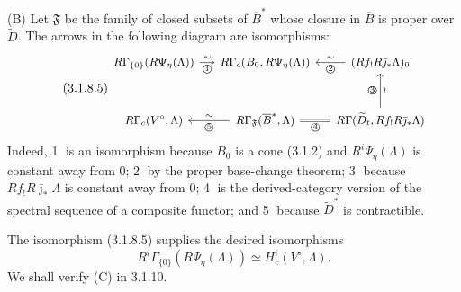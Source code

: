 \medskip
\noindent\textup{(B)}
Let $\mathfrak F$ be the family of closed subsets of $\overline B^*$
whose closure in $\overline B$ is proper over $\widetilde D$.  The
arrows in the following diagram are isomorphisms:
\begin{equation}\tag{3.1.8.5}
\begin{tikzcd}[column sep=small,row sep=large,cells={nodes={font=\small}}]
R\Gamma_{\{0\}}(R\Psi_\eta(\Lambda))
  \arrow[r,"\sim","\text{\textcircled{1}}"']
  & R\Gamma_c(B_0,R\Psi_\eta(\Lambda))
  & (Rf_!R\bar\jmath_*\Lambda)_0
      \arrow[l,"\sim"',"\text{\textcircled{2}}"] \\
R\Gamma_c(V^\circ,\Lambda)
  & R\Gamma_{\mathfrak F}(\overline B^*,\Lambda)
      \arrow[l,"\sim"',"\text{\textcircled{5}}"]
      \arrow[r,equal,"\text{\textcircled{4}}"']
  & R\Gamma(\widetilde D_t,Rf_!R\bar\jmath_*\Lambda)
      \arrow[u,"\text{\textcircled{3}}","\wr"']
\end{tikzcd}
\end{equation}
Indeed, \textcircled{1} is an isomorphism because $B_0$ is a cone
(3.1.2) and $R^i\Psi_\eta(\Lambda)$ is constant away from $0$;
\textcircled{2} by the proper base-change theorem;
\textcircled{3} because $Rf_!R\bar\jmath_*\Lambda$ is constant away
from $0$; \textcircled{4} is the derived-category version of the
spectral sequence of a composite functor; and \textcircled{5} because
$\widetilde D^*$ is contractible.

The isomorphism (3.1.8.5) supplies the desired isomorphisms
\begin{equation}\tag{3.1.8.6}
R^i\Gamma_{\{0\}}(R\Psi_\eta(\Lambda))
\simeq H_c^i(V^\circ,\Lambda).
\end{equation}
We shall verify (C) in 3.1.10.

